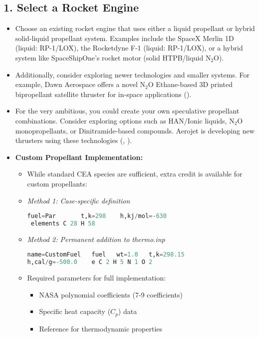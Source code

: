 \documentclass[12pt]{article}
\begin{document}
\subsection{1. Select a Rocket Engine}
\begin{itemize}
    \item Choose an existing rocket engine that uses either a liquid propellant or hybrid solid-liquid propellant system. Examples include the SpaceX Merlin 1D (liquid: RP-1/LOX), the Rocketdyne F-1 (liquid: RP-1/LOX), or a hybrid system like SpaceShipOne's rocket motor (solid HTPB/liquid N$_2$O).
    
    \item Additionally, consider exploring newer technologies and smaller systems. For example, Dawn Aerospace offers a novel N$_2$O Ethane-based 3D printed bipropellant satellite thruster for in-space applications (\cite{dawn_aero}).
    
    \item For the very ambitious, you could create your own speculative propellant combinations. Consider exploring options such as HAN/Ionic liquids, N$_2$O monopropellants, or Dinitramide-based compounds. Aerojet is developing new thrusters using these technologies (\cite{aerojet_report}, \cite{hybrid_prop}).
    
    \item \textbf{Custom Propellant Implementation:}
    \begin{itemize}
        \item While standard CEA species are sufficient, extra credit is available for custom propellants:
        
        \item \textit{Method 1: Case-specific definition}
        \begin{lstlisting}[language=Python,basicstyle=\small\ttfamily,frame=single]
fuel=Par       t,k=298    h,kj/mol=-630
 elements C 28 H 58
        \end{lstlisting}

        \item \textit{Method 2: Permanent addition to thermo.inp}
        \begin{lstlisting}[language=Python,basicstyle=\small\ttfamily,frame=single]
name=CustomFuel   fuel   wt=1.0   t,k=298.15
h,cal/g=-500.0    e C 2 H 5 N 1 O 2
        \end{lstlisting}

        \item Required parameters for full implementation:
        \begin{itemize}
            \item NASA polynomial coefficients (7-9 coefficients)
            \item Specific heat capacity ($C_p$) data
            \item Reference for thermodynamic properties
        \end{itemize}
    \end{itemize}
    

\end{itemize}
\end{document}
